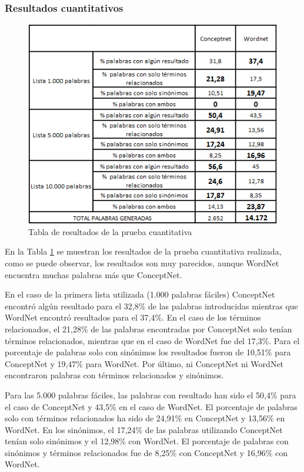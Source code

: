 \subsubsection{Resultados cuantitativos}
\label{cap:subsec:pruebaCuantitativa}
\begin{figure}[!h]
	\includegraphics[width=.8\textwidth]{Imagenes/Bitmap/Capitulo4/tabla_cuantitativa}
	\centering
	\caption{Tabla de resultados de la prueba cuantitativa}
	\label{fig:tabla_cuantitativa}
\end{figure}


En la Tabla \ref{fig:tabla_cuantitativa} se muestran los resultados de la prueba cuantitativa realizada, como se puede observar, los resultados son muy parecidos, aunque WordNet encuentra muchas palabras más que ConceptNet.

En el caso de la primera lista utilizada (1.000 palabras fáciles) ConceptNet encontró algún resultado para el 32,8\% de las palabras introducidas mientras que WordNet encontró resultados para el 37,4\%. En el caso de los términos relacionados, el 21,28\% de las palabras encontradas por ConceptNet solo tenían términos relacionados, mientras que en el caso de WordNet fue del 17,3\%. Para el porcentaje de palabras solo con sinónimos los resultados fueron de 10,51\% para ConceptNet y 19,47\% para WordNet. Por último, ni ConceptNet ni WordNet encontraron palabras con términos relacionados y sinónimos.

Para las 5.000 palabras fáciles, las palabras con resultado han sido el 50,4\% para el caso de ConceptNet y 43,5\% en el caso de WordNet. El porcentaje de palabras solo con términos relacionados ha sido de 24,91\% en ConceptNet y 13,56\% en WordNet. En los sinónimos, el 17,24\% de las palabras utilizando ConceptNet tenían solo sinónimos y el 12,98\% con WordNet. El porcentaje de palabras con sinónimos y términos relacionados fue de 8,25\% con ConceptNet y 16,96\% con WordNet.

